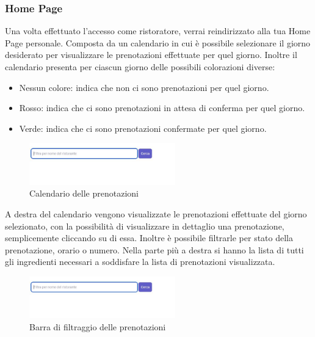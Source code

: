     \subsubsection{Home Page}
    Una volta effettuato l'accesso come ristoratore, verrai reindirizzato alla tua Home Page personale. Composta da un calendario in cui è possibile selezionare il giorno desiderato per visualizzare le prenotazioni effettuate per quel giorno. Inoltre il calendario presenta per ciascun giorno delle possibili colorazioni diverse:
        \begin{itemize}
            \item Nessun colore: indica che non ci sono prenotazioni per quel giorno.
            \item Rosso: indica che ci sono prenotazioni in attesa di conferma per quel giorno.
            \item Verde: indica che ci sono prenotazioni confermate per quel giorno.
        \end{itemize}
        
        \begin{figure}[htbp]
            \centering
            \includegraphics[width=0.5625\textwidth]{./img/Dettaglio.jpg}
            \caption{Calendario delle prenotazioni}
        \end{figure}
        
        A destra del calendario vengono visualizzate le prenotazioni effettuate del giorno selezionato, con la possibilità di visualizzare in dettaglio una prenotazione, semplicemente cliccando su di essa. Inoltre è possibile filtrarle per stato della prenotazione, orario o numero. Nella parte più a destra si hanno la lista di tutti gli ingredienti necessari a soddisfare la lista di prenotazioni visualizzata.
        
        \begin{figure}[htbp]
            \centering
            \includegraphics[width=0.5625\textwidth]{./img/Dettaglio.jpg}
            \caption{Barra di filtraggio delle prenotazioni}
        \end{figure}
        
